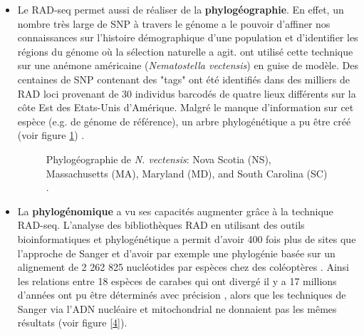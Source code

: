 \documentclass[a4paper]{article}
\begin{document}
\begin{itemize}
\item Le RAD-seq permet aussi de réaliser de la \textbf{phylogéographie}. En effet, un nombre très large de SNP à travers le génome a le pouvoir d'affiner nos connaissances sur l'histoire démographique d'une population et d'identifier les régions du génome où la sélection naturelle a agit. \cite{Reitzel:2013aa} ont utilisé cette technique sur une anémone américaine (\textit{Nematostella vectensis}) en guise de modèle. Des centaines de SNP contenant des "tags" ont été identifiés dans des milliers de RAD loci provenant de 30 individus barcodés de quatre lieux différents sur la côte Est des Etats-Unis d'Amérique. Malgré le manque d'information sur cet espèce (e.g. de génome de référence), un arbre phylogénétique a pu être créé (voir figure \ref{3}) \cite{Reitzel:2013aa}.

\begin{figure}[!h]
\caption{Phylogéographie de \textit{N. vectensis}: Nova Scotia (NS), Massachusetts (MA), Maryland (MD), and South Carolina (SC) \cite{Reitzel:2013aa}\label{3}.}
\end{figure}

\item La \textbf{phylogénomique} a vu ses capacités augmenter grâce à la technique RAD-seq. L'analyse des bibliothèques RAD en utilisant des outils bioinformatiques et phylogénétique a permit d'avoir 400 fois plus de sites que l'approche de Sanger et d'avoir par exemple une phylogénie basée sur un alignement de 2 262 825 nucléotides par espèces chez des coléoptères \cite{cruaud2014empirical}. Ainsi les relations entre 18 espèces de carabes qui ont divergé il y a 17 millions d'années ont pu être déterminés avec précision \cite{cruaud2014empirical}, alors que les techniques de Sanger via l'ADN nucléaire et mitochondrial ne donnaient pas les mêmes résultats (voir figure \ref{4}). 


\end{itemize}
\end{document}
